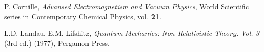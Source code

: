 \documentclass{article}
\theoremstyle{definition}
\theoremstyle{remark}
\begin{document}
\begin{thebibliography}{66}


 P. Cornille, {\em Advansed Electromagnetism and Vacuum Physics}, World Scientific series in Contemporary Chemical
Physics, vol. {\bf 21}.




L.D. Landau, E.M. Lifshitz,  {\em Quantum Mechanics:
Non-Relativistic Theory. Vol. 3} (3rd ed.) (1977), Pergamon Press.


\end{thebibliography}
\end{document}
